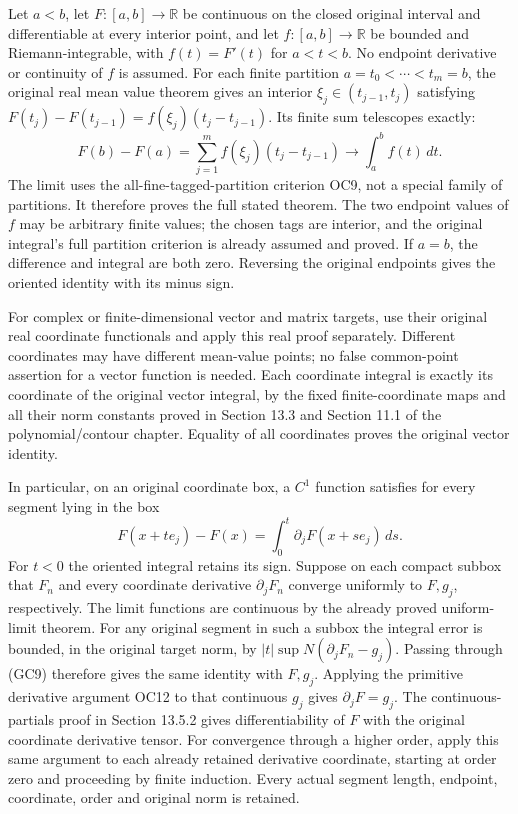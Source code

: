 \documentclass[
  11pt,
]{article}
\begin{document}
Let \(a<b\), let \(F:[a,b]\to\mathbb R\) be continuous on the closed
original interval and differentiable at every interior point, and let
\(f:[a,b]\to\mathbb R\) be bounded and Riemann-integrable, with
\(f(t)=F'(t)\) for \(a<t<b\). No endpoint derivative or continuity of
\(f\) is assumed. For each finite partition \(a=t_0<\cdots<t_m=b\), the
original real mean value theorem gives an interior
\(\xi_j\in(t_{j-1},t_j)\) satisfying
\(F(t_j)-F(t_{j-1})=f(\xi_j)(t_j-t_{j-1})\). Its finite sum telescopes
exactly: \[
 F(b)-F(a)=\sum_{j=1}^m f(\xi_j)(t_j-t_{j-1})
             \longrightarrow\int_a^b f(t)\,dt .
 \tag{GC8}
\] The limit uses the all-fine-tagged-partition criterion OC9, not a
special family of partitions. It therefore proves the full stated
theorem. The two endpoint values of \(f\) may be arbitrary finite
values; the chosen tags are interior, and the original integral's full
partition criterion is already assumed and proved. If \(a=b\), the
difference and integral are both zero. Reversing the original endpoints
gives the oriented identity with its minus sign.

For complex or finite-dimensional vector and matrix targets, use their
original real coordinate functionals and apply this real proof
separately. Different coordinates may have different mean-value points;
no false common-point assertion for a vector function is needed. Each
coordinate integral is exactly its coordinate of the original vector
integral, by the fixed finite-coordinate maps and all their norm
constants proved in Section 13.3 and Section 11.1 of the
polynomial/contour chapter. Equality of all coordinates proves the
original vector identity.

In particular, on an original coordinate box, a \(C^1\) function
satisfies for every segment lying in the box \[
 F(x+t e_j)-F(x)
      =\int_0^t\partial_j F(x+s e_j)\,ds .
 \tag{GC9}
\] For \(t<0\) the oriented integral retains its sign. Suppose on each
compact subbox that \(F_n\) and every coordinate derivative
\(\partial_jF_n\) converge uniformly to \(F,g_j\), respectively. The
limit functions are continuous by the already proved uniform-limit
theorem. For any original segment in such a subbox the integral error is
bounded, in the original target norm, by
\(|t|\sup N(\partial_jF_n-g_j)\). Passing through (GC9) therefore gives
the same identity with \(F,g_j\). Applying the primitive derivative
argument OC12 to that continuous \(g_j\) gives \(\partial_jF=g_j\). The
continuous-partials proof in Section 13.5.2 gives differentiability of
\(F\) with the original coordinate derivative tensor. For convergence
through a higher order, apply this same argument to each already
retained derivative coordinate, starting at order zero and proceeding by
finite induction. Every actual segment length, endpoint, coordinate,
order and original norm is retained.
\end{document}
